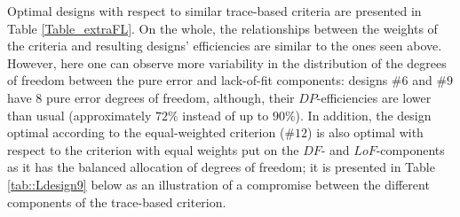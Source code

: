 Optimal designs with respect to similar trace-based criteria are presented in Table \ref{Table_extraFL}. On the whole, the relationships between the weights of the criteria and resulting designs' efficiencies are similar to the ones seen above. However, here one can observe more variability in the distribution of the degrees of freedom between the pure error and lack-of-fit components: designs \#$6$ and \#$9$ have $8$ pure error degrees of freedom, although, their $DP$-efficiencies are lower than  usual (approximately $72\%$ instead of up to $90\%$). In addition, the design optimal according to the equal-weighted criterion (\#$12$) is also optimal with respect to the criterion with equal weights put on the $DF$- and $LoF$-components as it has the balanced allocation of degrees of freedom; it is presented in Table \ref{tab::Ldesign9} below as an illustration of a compromise between the different components of the trace-based criterion.     

\begin{table}[h]
\centering
\caption{Example 1. Properties of optimal designs with respect to trace-based compound criteria with an extra F-quantile}
\label{Table_extraFL}
\scalebox{0.8}{
\begin{tabular}{rrrrr|rr|rrrrrr}
\textbf{} & \multicolumn{4}{l}{\textbf{Criteria}} & \multicolumn{2}{l}{\textbf{DoF}} & \multicolumn{6}{l}{\textbf{Efficiency, \%}} \\
\textbf{} & \textbf{L} & \textbf{LP} & \textbf{DF} & \textbf{LoF} & \textbf{PE} & \textbf{LoF} & \textbf{D} & \textbf{DP} & \textbf{L} & \textbf{LP} & \textbf{LoF} & \textbf{DF} \\
1 & 1 & 0 & 0 & 0 & 0 & 19 & 99.95 & 0.00 & 100.00 & 0.00 & 0.00 & 100.00\\
2 & 0 & 1 & 0 & 0 & 14 & 5 & 95.01 & 93.72 & 88.88 & 100.00 & 98.48 & 65.00 \\
3 & 0.5 & 0.5 & 0 & 0 & 11 & 8 & 97.18 & 86.50 & 92.83 & 99.18 & 98.83 & 72.50 \\
4 & 0.5 & 0 & 0.5 & 0 & 0 & 19 & 99.95 & 0.00 & 100.00 & 0.00 & 0.00 & 100.00\\
5 & 0.5 & 0 & 0 & 0.5 & 12 & 7 & 96.69 & 89.54 & 91.71 & 99.99 & 100.00 & 70.00\\
6 & 0 & 0.5 & 0.5 & 0 & 8 & 11 & 97.10 & 72.60 & 95.61 & 93.06 & 87.94 & 80.00 \\
7 & 0 & 0.5 & 0 & 0.5 & 13 & 6 & 95.55 & 91.54 & 90.11 & 99.93 & 99.93 & 67.50 \\
8 & 0 & 0 & 0.5 & 0.5 & 10 & 9 & 49.77 & 42.27 & 25.19 & 26.26 & 96.46 & 75.00\\
9 & 1/3 & 1/3 & 1/3 & 0 & 8 & 11 & 96.75 & 72.34 & 95.35 & 92.80 & 87.94 & 80.00\\
10 & 1/3 & 1/3 & 0 & 1/3 & 12 & 7 & 96.69 & 89.54 & 91.71 & 99.99 & 100.00 & 70.00\\
11 & 0 & 1/3 & 1/3 & 1/3 & 11 & 8 & 96.65 & 86.02 & 92.74 & 99.09 & 98.83 & 72.50\\
12 & 0.25 & 0.25 & 0.25 & 0.25 & 10 & 9 & 96.91 & 82.29 & 93.99 & 97.98 & 96.46 & 75.00
\end{tabular}
}
\end{table} 

